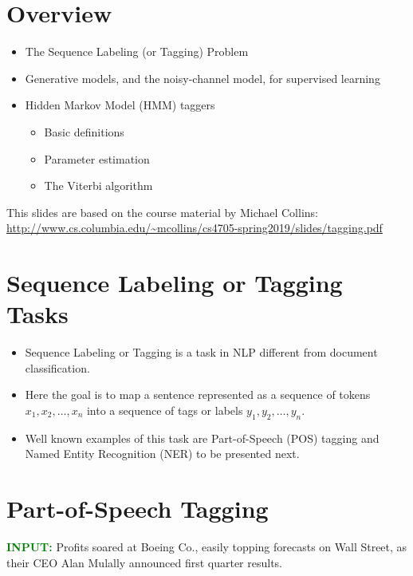 

\section{Overview}
  \begin{itemize}
    \item The Sequence Labeling (or Tagging) Problem
    \item Generative models, and the noisy-channel model, for supervised learning
    \item Hidden Markov Model (HMM) taggers
    \begin{itemize}\scriptsize
    \item Basic definitions
    \item Parameter estimation
    \item The Viterbi algorithm
    \end{itemize}
  \end{itemize}
 This slides are based on the course material by Michael Collins: \url{http://www.cs.columbia.edu/~mcollins/cs4705-spring2019/slides/tagging.pdf}


\section{Sequence Labeling or Tagging Tasks}

  \begin{itemize}
    \item Sequence Labeling or Tagging is a task in NLP different from document classification.
    \item Here the goal is to map a sentence represented as a sequence of tokens $x_1,x_2,\dots,x_n$ into a sequence of tags or labels $y_1,y_2,\dots,y_n$.
    \item Well known examples of this task are Part-of-Speech (POS) tagging and Named Entity Recognition (NER) to be presented next.
    \end{itemize}


\section{Part-of-Speech Tagging}
  \textcolor{green}{\textbf{INPUT:}}
  Profits soared at Boeing Co., easily topping forecasts on Wall Street, as their CEO Alan Mulally announced first quarter results.  \vspace{0.5cm}
  

